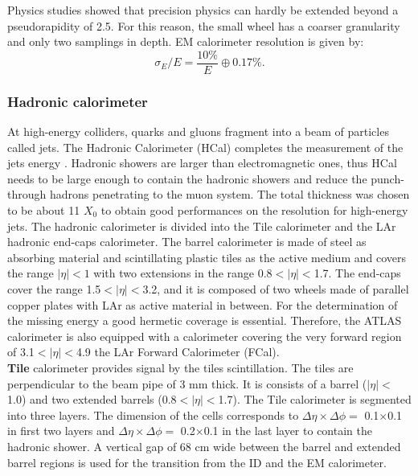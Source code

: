 Physics studies showed that precision physics can hardly be extended beyond a pseudorapidity of 2.5. For this reason, the small wheel has a coarser granularity and only two samplings in depth. EM calorimeter resolution is given by:
\begin{equation}
    \sigma_E/E = \frac{10\%}{E} \oplus 0.17\%.
\end{equation}

\subsubsection{Hadronic calorimeter}
\label{chap2:ATLAS:Calo:HCAL}
 At high-energy colliders, quarks and gluons fragment into a beam of particles called jets. The Hadronic Calorimeter (HCal) completes the measurement of the jets energy \cite{Tile_TDR}. Hadronic showers are larger than electromagnetic ones, thus HCal needs to be large enough to contain the hadronic showers and reduce the punch-through hadrons penetrating to the muon system. The total thickness was chosen to be about 11 $X_0$ to obtain good performances on the resolution for high-energy jets. The hadronic calorimeter is divided into the Tile calorimeter and the LAr hadronic end-caps calorimeter. The barrel calorimeter is made of steel as absorbing material and scintillating plastic tiles as the active medium and covers the range $|\eta|<1$ with two extensions in the range 0.8$<|\eta|<$1.7. The end-caps cover the range 1.5$<|\eta|<$3.2, and it is composed of two wheels made of parallel copper plates with LAr as active material in between. For the determination of the missing energy a good hermetic coverage is essential. Therefore, the ATLAS calorimeter is also equipped with a calorimeter covering the very forward region of 3.1$<|\eta|<$4.9 the LAr Forward Calorimeter (FCal). \\
 
\textbf{Tile} calorimeter provides signal by the tiles scintillation. The tiles are perpendicular to the beam pipe of 3 mm thick. It is consists of a barrel ($|\eta|<$1.0) and two extended barrels (0.8$<|\eta|<$1.7). The Tile calorimeter is segmented into three layers. The dimension of the cells corresponds to $\Delta\eta\times\Delta\phi=$ 0.1$\times$0.1 in first two layers and $\Delta\eta\times\Delta\phi=$ 0.2$\times$0.1 in the last layer to contain the hadronic shower. A vertical gap of 68 cm wide between the barrel and extended barrel regions is used for the transition from the ID and the EM calorimeter. \\
 
